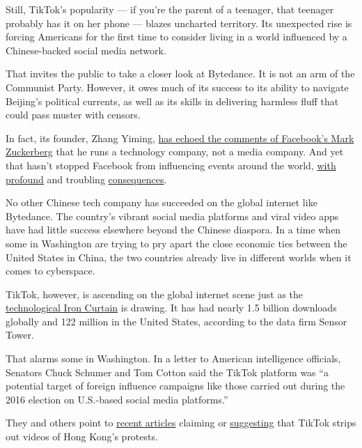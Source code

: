 Still, TikTok's popularity --- if you're the parent of a teenager, that
teenager probably has it on her phone --- blazes uncharted territory.
Its unexpected rise is forcing Americans for the first time to consider
living in a world influenced by a Chinese-backed social media network.

That invites the public to take a closer look at Bytedance. It is not an
arm of the Communist Party. However, it owes much of its success to its
ability to navigate Beijing's political currents, as well as its skills
in delivering harmless fluff that could pass muster with censors.

In fact, its founder, Zhang Yiming,
\href{https://www.nytimes.com/2018/04/11/business/zuckerberg-facebook-congress.html}{has
echoed the comments of Facebook's Mark Zuckerberg} that he runs a
technology company, not a media company. And yet that hasn't stopped
Facebook from influencing events around the world,
\href{https://www.nytimes.com/2019/10/21/technology/facebook-disinformation-russia-iran.html}{with}
\href{https://www.nytimes.com/2017/11/01/us/politics/russia-2016-election-facebook.html}{profound}
and troubling
\href{https://www.nytimes.com/2018/04/21/world/asia/facebook-sri-lanka-riots.html}{consequences}.

No other Chinese tech company has succeeded on the global internet like
Bytedance. The country's vibrant social media platforms and viral video
apps have had little success elsewhere beyond the Chinese diaspora. In a
time when some in Washington are trying to pry apart the close economic
ties between the United States in China, the two countries already live
in different worlds when it comes to cyberspace.

TikTok, however, is ascending on the global internet scene just as the
\href{https://www.nytimes.com/2019/05/20/business/huawei-trump-china-trade.html?rref=collection\%2Fbyline\%2Fli-yuan}{technological
Iron Curtain} is drawing. It has had nearly 1.5 billion downloads
globally and 122 million in the United States, according to the data
firm Sensor Tower.

That alarms some in Washington. In a letter to American intelligence
officials, Senators Chuck Schumer and Tom Cotton said the TikTok
platform was ``a potential target of foreign influence campaigns like
those carried out during the 2016 election on U.S.-based social media
platforms.''

They and others point to
\href{https://www.theguardian.com/technology/2019/sep/25/revealed-how-tiktok-censors-videos-that-do-not-please-beijing}{recent
articles} claiming or
\href{https://www.washingtonpost.com/technology/2019/09/15/tiktoks-beijing-roots-fuel-censorship-suspicion-it-builds-huge-us-audience/}{suggesting}
that TikTok strips out videos of Hong Kong's protests.

